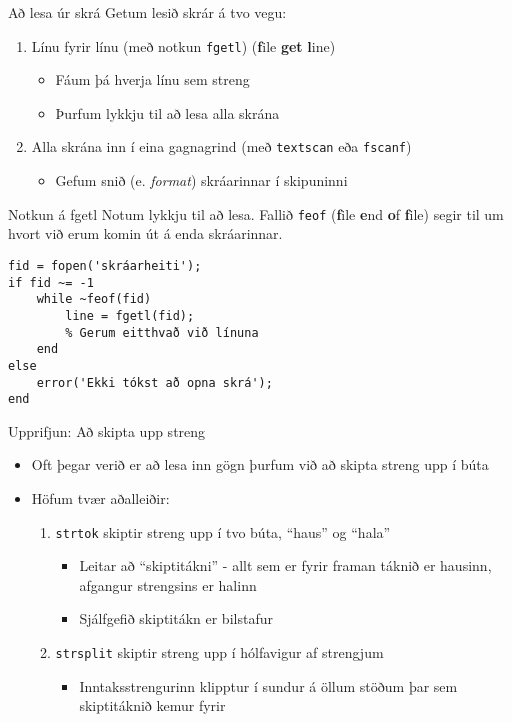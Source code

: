 \documentclass{beamer}
\begin{document}
\begin{frame}{Að lesa úr skrá}
Getum lesið skrár á tvo vegu:
\begin{enumerate}
 \item Línu fyrir línu (með notkun \texttt{fgetl}) (\textbf{f}ile \textbf{get} \textbf{l}ine)
 \begin{itemize}
  \item Fáum þá hverja línu sem streng
  \item Þurfum lykkju til að lesa alla skrána
 \end{itemize}
 \item Alla skrána inn í eina gagnagrind (með \texttt{textscan} eða \texttt{fscanf})
 \begin{itemize}
  \item Gefum snið (e. \emph{format}) skráarinnar í skipuninni
 \end{itemize}
\end{enumerate}
\end{frame}


\begin{frame}[fragile]{Notkun á fgetl}
\vspace{\baselineskip}
Notum lykkju til að lesa. Fallið \texttt{feof} (\textbf{f}ile \textbf{e}nd \textbf{o}f \textbf{f}ile) segir til um hvort við erum komin út á enda skráarinnar.
\begin{verbatim}
fid = fopen('skráarheiti');
if fid ~= -1
    while ~feof(fid)
        line = fgetl(fid);
        % Gerum eitthvað við línuna
    end
else
    error('Ekki tókst að opna skrá');
end
\end{verbatim}
\end{frame}

\begin{frame}[fragile]{Upprifjun: Að skipta upp streng}
\begin{itemize}
 \item Oft þegar verið er að lesa inn gögn þurfum við að skipta streng upp í búta
 \item Höfum tvær aðalleiðir: 
 \begin{enumerate}
  \item \texttt{strtok} skiptir streng upp í tvo búta, ``haus'' og ``hala''
  \begin{itemize}
   \item Leitar að ``skiptitákni'' - allt sem er fyrir framan táknið er hausinn, afgangur strengsins er halinn
   \item Sjálfgefið skiptitákn er bilstafur
  \end{itemize}
  \item \texttt{strsplit} skiptir streng upp í hólfavigur af strengjum
  \begin{itemize}
   \item Inntaksstrengurinn klipptur í sundur á öllum stöðum þar sem skiptitáknið kemur fyrir
  \end{itemize}
 \end{enumerate}
\end{itemize}
\end{frame}
\end{document}
